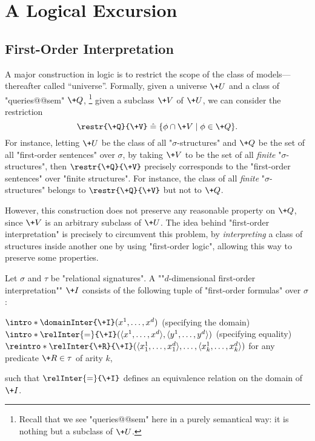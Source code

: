 \section{A Logical Excursion}
\label{sec:preliminaries-automatic-structures-logic}

\subsection{First-Order Interpretation}

A major construction in logic is to restrict the scope of the class
of models---thereafter called ``universe''.
Formally, given a universe $\+U$ and a class of "queries@@sem" $\+Q$,%
\footnote{Recall that we see "queries@@sem" here in a purely semantical way: it is nothing but a subclass of $\+U$.}
given a subclass $\+V$ of $\+U$, we can consider the restriction
\[
	\restr{\+Q}{\+V} \defeq \{\phi \cap \+V \mid \phi \in \+Q\}.
\]
For instance, letting $\+U$ be the class of all "$\sigma$-structures" and $\+Q$ be the set of all 
"first-order sentences" over $\sigma$, by taking $\+V$ to be the set of all \emph{finite}
"$\sigma$-structures", then $\restr{\+Q}{\+V}$ precisely corresponds to
the "first-order sentences" over "finite structures". For instance, the class of all
\emph{finite} "$\sigma$-structures" belongs to $\restr{\+Q}{\+V}$ but not to
$\+Q$.

However, this construction does not preserve any reasonable property on $\+Q$,
since $\+V$ is an arbitrary subclass of $\+U$. The idea behind "first-order interpretation"
is precisely to circumvent this problem, by \emph{interpreting} a class of structures
inside another one by using "first-order logic", allowing this way to preserve some properties.

Let $\sigma$ and $\tau$ be "relational signatures".
A \AP ""$d$-dimensional first-order interpretation"" $\+I$ consists of the following tuple of
"first-order formulas" over $\sigma$:
\begin{itemize}
	\itemAP $\intro*\domainInter{\+I}(x^1,\dotsc, x^d)$ (specifying the domain)
	\itemAP $\intro*\relInter{=}{\+I}(\tup{x^1,\dotsc, x^d}, \tup{y^1,\dotsc, y^d})$ (specifying equality)
	\itemAP $\reintro*\relInter{\+R}{\+I}(\tup{x^1_1,\dotsc,x^d_1}, \dotsc, \tup{x^1_k,\dotsc,x^d_k})$
		for any predicate $\+R \in \tau$ of arity $k$,
\end{itemize}
such that $\relInter{=}{\+I}$ defines an equivalence relation on the domain of $\+I$.

